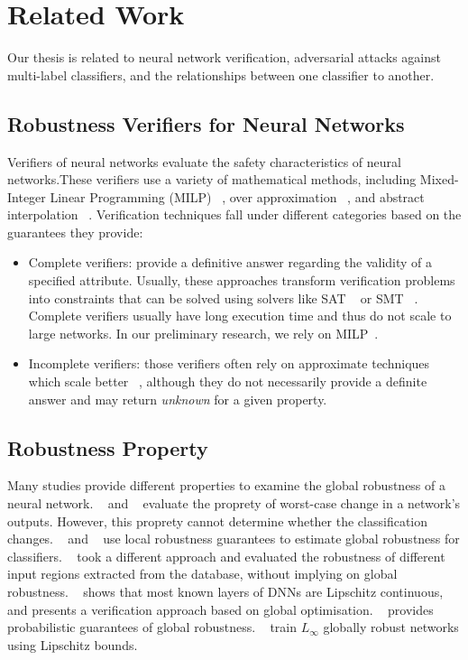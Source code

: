 
\section{Related Work}
Our thesis is related to neural network verification, adversarial attacks against multi-label classifiers, and the relationships between one classifier to another.

\subsection{Robustness Verifiers for Neural Networks}\label{subsec:verifiers}
Verifiers of neural networks evaluate the safety characteristics of neural networks.These verifiers use a variety of mathematical methods, including Mixed-Integer Linear Programming (MILP) ~\cite{singh2018robustness,lazarus2022mixed}, over approximation ~\cite{qin2019verification}, and abstract interpolation ~\cite{ABSTRACTINTER,INCOMPLETE1}. Verification techniques fall under different categories based on the guarantees they provide:
\begin{itemize}
    \item  Complete verifiers: provide a definitive answer regarding the validity of a specified attribute. Usually, these approaches transform verification problems into constraints that can be solved using solvers like SAT ~\cite{SATAPPROACH1,SATAPPROACH2} or SMT ~\cite{NNTOBINARCONSTRAINS,PLANET,Reluplex}. Complete verifiers usually have long execution time and thus do not scale to large networks.
        In our preliminary research, we rely on MILP~\cite{MIPVERIFY}.
    \item Incomplete verifiers: those verifiers often rely on approximate techniques which scale better ~\cite{INCOMPLETE1,INCOMPLETE2}, although they do not necessarily provide a definite answer and may return \emph{unknown} for a given property. 
\end{itemize}

\subsection{Robustness Property}
Many studies provide different properties to examine the global robustness of a neural network.
~\cite{Reluplex} and ~\cite{GLOBALROBTWINEN} evaluate the proprety of worst-case change in a network’s outputs. However, this proprety cannot determine whether the classification changes. ~\cite{MEASURENNROBCON} and ~\cite{GLOBALPROPERTY} use local robustness guarantees to estimate global robustness for classifiers. ~\cite{ROBUSTFROMDATASET} took a different approach and evaluated the robustness of different input regions extracted from the database, without implying on global robustness. ~\cite{ANOTHERGLOBALPROPERTY} shows that most known layers of DNNs are Lipschitz continuous, and presents a verification approach based on global optimisation. ~\cite{GROMA} provides probabilistic guarantees of global robustness. ~\cite{RETHINKLIP} train \( L_\infty \) globally robust networks using Lipschitz bounds.

